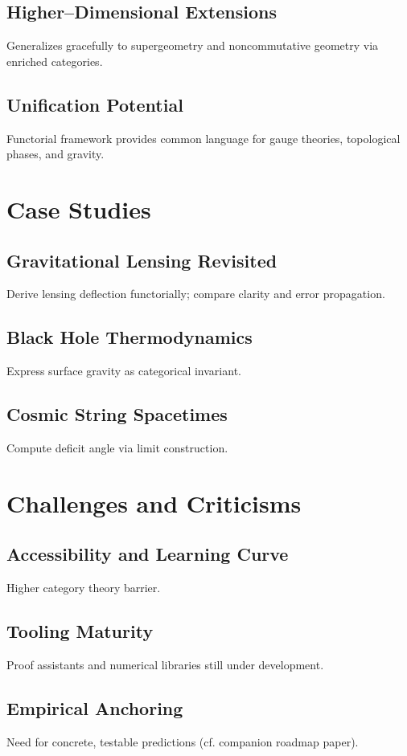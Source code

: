\documentclass[11pt]{article}
\begin{document}
\subsection{Higher--Dimensional Extensions}
Generalizes gracefully to supergeometry and noncommutative geometry via enriched categories.
\subsection{Unification Potential}
Functorial framework provides common language for gauge theories, topological phases, and gravity.

\section{Case Studies}
\subsection{Gravitational Lensing Revisited}
Derive lensing deflection functorially; compare clarity and error propagation.
\subsection{Black Hole Thermodynamics}
Express surface gravity as categorical invariant.
\subsection{Cosmic String Spacetimes}
Compute deficit angle via limit construction.

\section{Challenges and Criticisms}
\subsection{Accessibility and Learning Curve}
Higher category theory barrier.
\subsection{Tooling Maturity}
Proof assistants and numerical libraries still under development.
\subsection{Empirical Anchoring}
Need for concrete, testable predictions (cf. companion roadmap paper).
\end{document}
